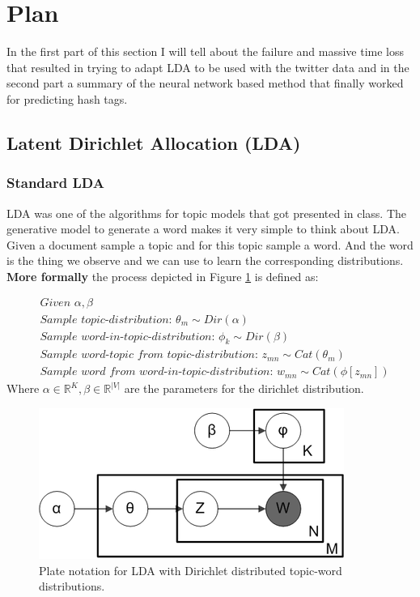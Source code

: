 \documentclass[10pt,conference,compsocconf]{IEEEtran}
\newcommand\R{\mathbb{R}}
\begin{document}
\section{Plan}
\label{sec:Plan}
In the first part of this section I will tell about the failure and massive time loss that resulted in trying to adapt LDA to be used with the twitter data and in the second part a summary of the neural network based method that finally worked for predicting hash tags. 
\subsection{Latent Dirichlet Allocation (LDA)}
\subsubsection{Standard LDA}
LDA was one of the algorithms for topic models that got presented in class. The generative model to generate a word makes it very simple to think about LDA. Given a document sample a topic and for this topic sample a word. And the word is the thing we observe and we can use to learn the corresponding distributions. \\
\textbf{More formally} the process depicted in Figure \ref{fig:ldaplate} is defined as: 

\small
\begin{align*}
&\textit{Given } \alpha, \beta \\
&\textit{Sample topic-distribution: } \theta_m \sim Dir(\alpha)\\
&\textit{Sample word-in-topic-distribution: } \phi_k \sim Dir(\beta) \\
&\textit{Sample word-topic from topic-distribution: } z_{mn} \sim Cat(\theta_m) \\
&\textit{Sample word from word-in-topic-distribution: } w_{mn} \sim Cat(\phi[z_{mn}])
\end{align*}
\normalsize
Where $\alpha \in \R^K, \beta \in \R^{|V|}$ are the parameters for the dirichlet distribution. 

\begin{figure}
	\centering
	\includegraphics[width=0.7\linewidth]{images/lda_plate}
	\caption{Plate notation for LDA with Dirichlet distributed topic-word distributions.}
	\label{fig:ldaplate}
\end{figure}
\end{document}
